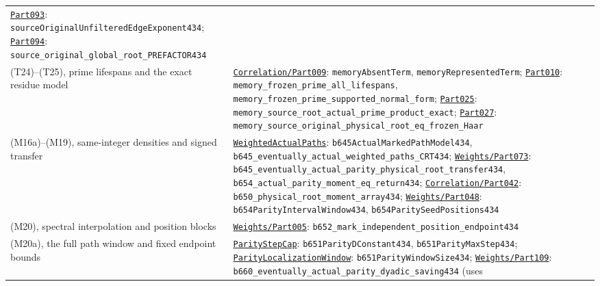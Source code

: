 \begin{longtable}[]{@{}
  >{\raggedright\arraybackslash}p{}
  >{\raggedright\arraybackslash}p{}@{}}
\href{../Green64/Library/Weights/Part093.lean}{\nolinkurl{Part093}}:
{\small\nolinkurl{sourceOriginalUnfilteredEdgeExponent434}};
\href{../Green64/Library/Weights/Part094.lean}{\nolinkurl{Part094}}:
{\small\nolinkurl{source_original_global_root_PREFACTOR434}} \\
(T24)--(T25), prime lifespans and the exact residue model &
\href{../Green64/Library/Correlation/Part009.lean}{\nolinkurl{Correlation/Part009}}:
{\small\nolinkurl{memoryAbsentTerm}},
{\small\nolinkurl{memoryRepresentedTerm}};
\href{../Green64/Library/Correlation/Part010.lean}{\nolinkurl{Part010}}:
{\small\nolinkurl{memory_frozen_prime_all_lifespans}},
{\small\nolinkurl{memory_frozen_prime_supported_normal_form}};
\href{../Green64/Library/Correlation/Part025.lean}{\nolinkurl{Part025}}:
{\small\nolinkurl{memory_source_root_actual_prime_product_exact}};
\href{../Green64/Library/Correlation/Part027.lean}{\nolinkurl{Part027}}:
{\small\nolinkurl{memory_source_original_physical_root_eq_frozen_Haar}} \\
(M16a)--(M19), same-integer densities and signed transfer &
\href{../Green64/Library/Weights/WeightedActualPaths.lean}{\nolinkurl{WeightedActualPaths}}:
{\small\nolinkurl{b645ActualMarkedPathModel434}},
{\small\nolinkurl{b645_eventually_actual_weighted_paths_CRT434}};
\href{../Green64/Library/Weights/Part073.lean}{\nolinkurl{Weights/Part073}}:
{\small\nolinkurl{b645_eventually_actual_parity_physical_root_transfer434}},
{\small\nolinkurl{b654_actual_parity_moment_eq_return434}};
\href{../Green64/Library/Correlation/Part042.lean}{\nolinkurl{Correlation/Part042}}:
{\small\nolinkurl{b650_physical_root_moment_array434}};
\href{../Green64/Library/Weights/Part048.lean}{\nolinkurl{Weights/Part048}}:
{\small\nolinkurl{b654ParityIntervalWindow434}},
{\small\nolinkurl{b654ParitySeedPositions434}} \\
(M20), spectral interpolation and position blocks &
\href{../Green64/Library/Weights/Part005.lean}{\nolinkurl{Weights/Part005}}:
{\small\nolinkurl{b652_mark_independent_position_endpoint434}} \\
(M20a), the full path window and fixed endpoint bounds &
\href{../Green64/Library/Weights/ParityStepCap.lean}{\nolinkurl{ParityStepCap}}:
{\small\nolinkurl{b651ParityDConstant434}},
{\small\nolinkurl{b651ParityMaxStep434}};
\href{../Green64/Library/Weights/ParityLocalizationWindow.lean}{\nolinkurl{ParityLocalizationWindow}}:
{\small\nolinkurl{b651ParityWindowSize434}};
\href{../Green64/Library/Weights/Part109.lean}{\nolinkurl{Weights/Part109}}:
{\small\nolinkurl{b660_eventually_actual_parity_dyadic_saving434}} (uses

\end{longtable}
